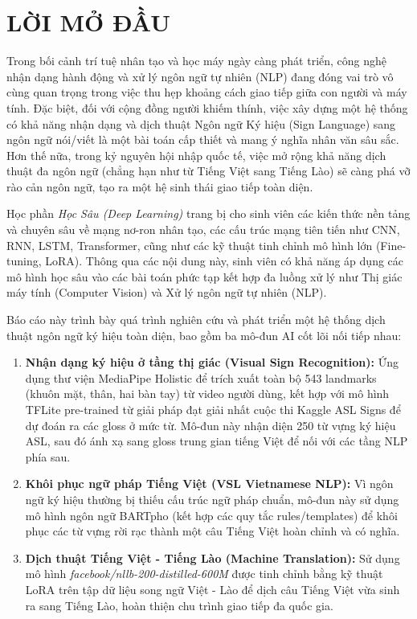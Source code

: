 ﻿\documentclass{article}
\numberwithin{equation}{section}
\numberwithin{figure}{section}
\numberwithin{table}{section}
\begin{document}
\newpage

\section*{LỜI MỞ ĐẦU}

Trong bối cảnh trí tuệ nhân tạo và học máy ngày càng phát triển, công nghệ nhận dạng hành động và xử lý ngôn ngữ tự nhiên (NLP) đang đóng vai trò vô cùng quan trọng trong việc thu hẹp khoảng cách giao tiếp giữa con người và máy tính. Đặc biệt, đối với cộng đồng người khiếm thính, việc xây dựng một hệ thống có khả năng nhận dạng và dịch thuật Ngôn ngữ Ký hiệu (Sign Language) sang ngôn ngữ nói/viết là một bài toán cấp thiết và mang ý nghĩa nhân văn sâu sắc. Hơn thế nữa, trong kỷ nguyên hội nhập quốc tế, việc mở rộng khả năng dịch thuật đa ngôn ngữ (chẳng hạn như từ Tiếng Việt sang Tiếng Lào) sẽ càng phá vỡ rào cản ngôn ngữ, tạo ra một hệ sinh thái giao tiếp toàn diện.

Học phần \textit{Học Sâu (Deep Learning)} trang bị cho sinh viên các kiến thức nền tảng và chuyên sâu về mạng nơ-ron nhân tạo, các cấu trúc mạng tiên tiến như CNN, RNN, LSTM, Transformer, cũng như các kỹ thuật tinh chỉnh mô hình lớn (Fine-tuning, LoRA). Thông qua các nội dung này, sinh viên có khả năng áp dụng các mô hình học sâu vào các bài toán phức tạp kết hợp đa luồng xử lý như Thị giác máy tính (Computer Vision) và Xử lý ngôn ngữ tự nhiên (NLP).

Báo cáo này trình bày quá trình nghiên cứu và phát triển một hệ thống dịch thuật ngôn ngữ ký hiệu toàn diện, bao gồm ba mô-đun AI cốt lõi nối tiếp nhau:
\begin{enumerate}
    \item \textbf{Nhận dạng ký hiệu ở tầng thị giác (Visual Sign Recognition):} Ứng dụng thư viện MediaPipe Holistic để trích xuất toàn bộ 543 landmarks (khuôn mặt, thân, hai bàn tay) từ video người dùng, kết hợp với mô hình TFLite pre-trained từ giải pháp đạt giải nhất cuộc thi Kaggle ASL Signs để dự đoán ra các gloss ở mức từ. Mô-đun này nhận diện 250 từ vựng ký hiệu ASL, sau đó ánh xạ sang gloss trung gian tiếng Việt để nối với các tầng NLP phía sau.
    \item \textbf{Khôi phục ngữ pháp Tiếng Việt (VSL Vietnamese NLP):} Vì ngôn ngữ ký hiệu thường bị thiếu cấu trúc ngữ pháp chuẩn, mô-đun này sử dụng mô hình ngôn ngữ BARTpho (kết hợp các quy tắc rules/templates) để khôi phục các từ vựng rời rạc thành một câu Tiếng Việt hoàn chỉnh và có nghĩa.
    \item \textbf{Dịch thuật Tiếng Việt - Tiếng Lào (Machine Translation):} Sử dụng mô hình \textit{facebook/nllb-200-distilled-600M} được tinh chỉnh bằng kỹ thuật LoRA trên tập dữ liệu song ngữ Việt - Lào để dịch câu Tiếng Việt vừa sinh ra sang Tiếng Lào, hoàn thiện chu trình giao tiếp đa quốc gia.
\end{enumerate}
\end{document}
